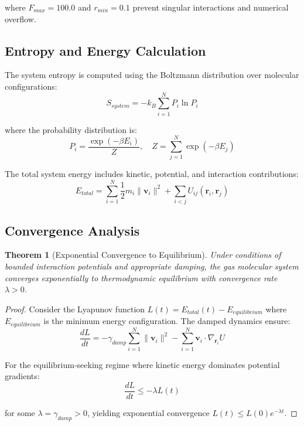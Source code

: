 \documentclass[11pt,a4paper]{article}
\newtheorem{theorem}{Theorem}[section]
\begin{document}
where $F_{max} = 100.0$ and $r_{min} = 0.1$ prevent singular interactions and numerical overflow.

\subsection{Entropy and Energy Calculation}

The system entropy is computed using the Boltzmann distribution over molecular configurations:
\begin{equation}
S_{system} = -k_B \sum_{i=1}^{N} P_i \ln P_i
\label{eq:system-entropy}
\end{equation}

where the probability distribution is:
\begin{equation}
P_i = \frac{\exp(-\beta E_i)}{Z}, \quad Z = \sum_{j=1}^{N} \exp(-\beta E_j)
\label{eq:boltzmann-distribution}
\end{equation}

The total system energy includes kinetic, potential, and interaction contributions:
\begin{equation}
E_{total} = \sum_{i=1}^{N} \frac{1}{2} m_i \|\mathbf{v}_i\|^2 + \sum_{i<j} U_{ij}(\mathbf{r}_i, \mathbf{r}_j)
\label{eq:total-energy}
\end{equation}

\subsection{Convergence Analysis}

\begin{theorem}[Exponential Convergence to Equilibrium]
Under conditions of bounded interaction potentials and appropriate damping, the gas molecular system converges exponentially to thermodynamic equilibrium with convergence rate $\lambda > 0$.
\end{theorem}

\begin{proof}
Consider the Lyapunov function $L(t) = E_{total}(t) - E_{equilibrium}$ where $E_{equilibrium}$ is the minimum energy configuration. The damped dynamics ensure:
\begin{equation}
\frac{dL}{dt} = -\gamma_{damp} \sum_{i=1}^{N} \|\mathbf{v}_i\|^2 - \sum_{i=1}^{N} \mathbf{v}_i \cdot \nabla_{\mathbf{r}_i} U
\end{equation}

For the equilibrium-seeking regime where kinetic energy dominates potential gradients:
\begin{equation}
\frac{dL}{dt} \leq -\lambda L(t)
\end{equation}

for some $\lambda = \gamma_{damp} > 0$, yielding exponential convergence $L(t) \leq L(0) e^{-\lambda t}$.
\end{proof}
\end{document}

